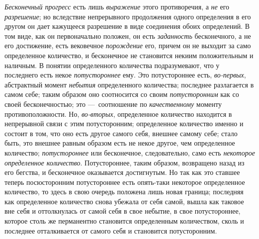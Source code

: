 {{\em Бесконечный прогресс} есть лишь
{\em выражение} этого противоречия, а
{\em не} его {\em разрешение}; но
вследствие непрерывного продолжения одного определения в его другом он дает
кажущееся разрешение в виде соединения обоих определений. В том виде, как
он первоначально положен, он есть {\em заданность}
бесконечного, а не его достижение, есть вековечное
{\em порождение} его, причем он не выходит за само
определенное количество, и бесконечное не становится некиим положительным и
наличным. В понятии определенного количества подразумевают, что у
последнего есть некое {\em потустороннее} ему. Это
потустороннее есть, {\em во-первых}, абстрактный момент
{\em небытия} определенного количества; последнее
разлагается в самом себе; таким образом оно соотносится со своим
{\em потусторонним} как со своей бесконечностью; это
—~соотношение по {\em качественному} моменту
противоположности. Но, {\em во-вторых}, определенное
количество находится в непрерывной связи с этим потусторонним; определенное
количество именно и состоит в том, что оно есть другое самого себя, внешнее
самому себе; стало быть, это внешнее равным образом есть не некое другое,
чем определенное количество; {\em потустороннее} или
бесконечное, следовательно, само есть {\em некоторое
определенное количество}. Потустороннее, таким образом, возвращено назад из
его бегства, и бесконечное оказывается достигнутым. Но так как это ставшее
теперь посюсторонним потустороннее есть опять-таки некоторое определенное
количество, то здесь в свою очередь положена лишь новая граница; последняя
как определенное количество снова убежала от себя самой, вышла как таковое
вне себя и оттолкнулась от самой себя в свое небытие, в свое потустороннее,
которое столь же перманентно становится определенным количеством, сколь и
последнее отталкивается от самого себя и становится потусторонним.

}
